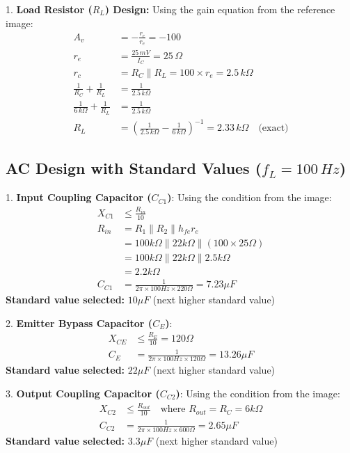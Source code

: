 \documentclass[conference]{IEEEtran}
\begin{document}
1. \textbf{Load Resistor ($R_L$) Design:}
Using the gain equation from the reference image:
\begin{align*}
    A_v &= -\frac{r_c}{r_e} = -100 \\
    r_e &= \frac{25\,mV}{I_C} = 25\,\Omega \\
    r_c &= R_C \parallel R_L = 100 \times r_e = 2.5\,k\Omega \\
    \frac{1}{R_C} + \frac{1}{R_L} &= \frac{1}{2.5\,k\Omega} \\
    \frac{1}{6\,k\Omega} + \frac{1}{R_L} &= \frac{1}{2.5\,k\Omega} \\
    R_L &= \left(\frac{1}{2.5\,k\Omega} - \frac{1}{6\,k\Omega}\right)^{-1} = 2.33\,k\Omega \quad \text{(exact)}
\end{align*}
\subsection{AC Design with Standard Values ($f_L = 100\,Hz$)}

1. \textbf{Input Coupling Capacitor ($C_{C1}$)}:
Using the condition from the image:
\begin{align*}
    X_{C1} &\leq \frac{R_{in}}{10} \\
    R_{in} &= R_1 \parallel R_2 \parallel h_{fe}r_e \\
           &= 100k\Omega \parallel 22k\Omega \parallel (100 \times 25\Omega) \\
           &= 100k\Omega \parallel 22k\Omega \parallel 2.5k\Omega \\
           &= 2.2k\Omega \\
    C_{C1} &= \frac{1}{2\pi \times 100Hz \times 220\Omega} = 7.23\mu F
\end{align*}
\textbf{Standard value selected:} $10\mu F$ (next higher standard value)

2. \textbf{Emitter Bypass Capacitor ($C_E$)}:
\begin{align*}
    X_{CE} &\leq \frac{R_E}{10} = 120\Omega \\
    C_E &= \frac{1}{2\pi \times 100Hz \times 120\Omega} = 13.26\mu F
\end{align*}
\textbf{Standard value selected:} $22\mu F$ (next higher standard value)

3. \textbf{Output Coupling Capacitor ($C_{C2}$)}:
Using the condition from the image:
\begin{align*}
    X_{C2} &\leq \frac{R_{out}}{10} \quad \text{where } R_{out} = R_C = 6k\Omega \\
    C_{C2} &= \frac{1}{2\pi \times 100Hz \times 600\Omega} = 2.65\mu F
\end{align*}
\textbf{Standard value selected:} $3.3\mu F$ (next higher standard value)
\end{document}
